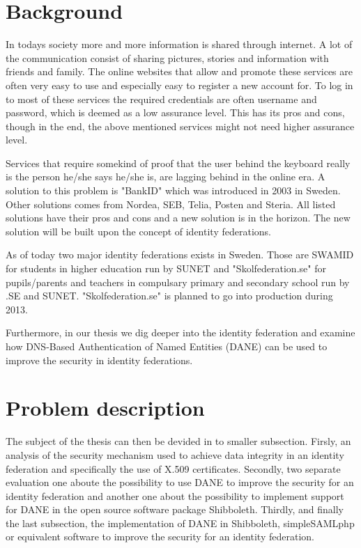\section{Background}
In todays society more and more information is shared through internet.
A lot of the communication consist of sharing pictures, stories and information with friends and family.
The online websites that allow and promote these services are often very easy to use and especially easy to register a new account for.
To log in to most of these services the required credentials are often username and password, which is deemed as a low assurance level\cite[p.~244]{pdf:SOU}.
This has its pros and cons, though in the end, the above mentioned services might not need higher assurance level.

Services that require somekind of proof that the user behind the keyboard really is the person he/she says he/she is, are lagging behind in the online era.
A solution to this problem is "BankID" which was introduced in 2003\cite{website:bankid-about} in Sweden.
Other solutions comes from Nordea, SEB, Telia, Posten and Steria\cite[p.~256]{pdf:SOU}.
All listed solutions have their pros and cons and a new solution is in the horizon.
The new solution will be built upon the concept of identity federations\cite[p.~23]{pdf:SOU}.

As of today two major identity federations exists in Sweden.
Those are SWAMID for students in higher education run by SUNET and "Skolfederation.se" for pupils/parents and teachers in compulsary primary and secondary school run by .SE and SUNET. "Skolfederation.se" is planned to go into production during 2013.

Furthermore, in our thesis we dig deeper into the identity federation and examine how DNS-Based Authentication of Named Entities (DANE) 
\cite{rfc:6394,rfc:draft-dane} can be used to improve the security in identity federations.

\section{Problem description}
The subject of the thesis can then be devided in to smaller subsection. 
Firsly, an analysis of the security mechanism used to achieve data integrity in an identity federation and 
specifically the use of X.509 certificates.
Secondly, two separate evaluation one aboute the possibility to use DANE to improve the security for an identity federation
and another one about the possibility to implement support for DANE in the open source software package Shibboleth.
Thirdly, and finally the last subsection, the implementation of DANE in Shibboleth, simpleSAMLphp or equivalent software to improve
the security for an identity federation.

